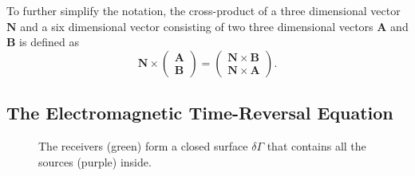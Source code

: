 To further simplify the notation, the cross-product of a three dimensional vector \(\bm{N}\) and a six dimensional vector consisting of two three dimensional vectors \(\bm{A}\) and \(\bm{B}\) is defined as
\begin{equation}
    \bm{N} \times \begin{pmatrix}
        \bm{A} \\
        \bm{B}
    \end{pmatrix} = \begin{pmatrix}
        \bm{N} \times \bm{B} \\
        \bm{N} \times \bm{A}
    \end{pmatrix}.
\end{equation}

\subsection{The Electromagnetic Time-Reversal Equation}
\begin{figure}
    \centering
    \def\svgwidth{0.5\textwidth}
    
    \caption{The receivers (green) form a closed surface \(\delta \Gamma \) that contains all the sources (purple) inside.}\label{fig:closed_surface}
\end{figure}

